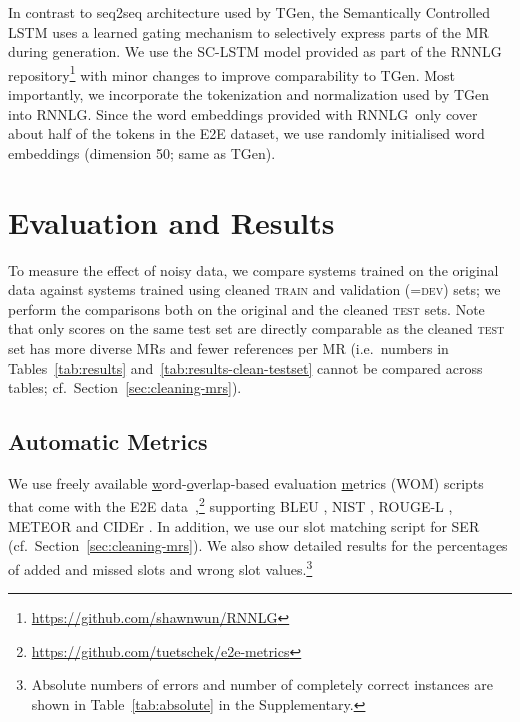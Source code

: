 \documentclass[11pt,a4paper]{article}
\newcommand{\rnnlg}{\textsc{RNNLG}}
\begin{document}
In contrast to seq2seq architecture used by TGen, the Semantically Controlled LSTM \citep[SC-LSTM,][]{wen:emnlp2015} uses a learned gating mechanism to selectively express parts of the MR during generation.
We use the SC-LSTM model provided as part of the \rnnlg{} repository\footnote{\url{https://github.com/shawnwun/RNNLG}} with minor changes to improve comparability to TGen.
Most importantly, we incorporate the tokenization and normalization used by TGen into \rnnlg.
Since the word embeddings provided with \rnnlg\ only cover about half of the tokens in the E2E dataset, we use randomly initialised word embeddings (dimension 50; same as TGen).






\section{Evaluation and Results}
\label{sec:evaluation}



To measure the effect of noisy data, we compare systems trained on the original data against systems trained using cleaned \textsc{train} and validation (=\textsc{dev}) sets; we perform the comparisons both on the original and the cleaned \textsc{test} sets.
Note that only scores on the same test set are directly comparable as the cleaned \textsc{test} set has more diverse MRs and fewer references per MR (i.e.\ numbers in Tables~\ref{tab:results} and~\ref{tab:results-clean-testset} cannot be compared across tables; cf.~Section~\ref{sec:cleaning-mrs}).



\subsection{Automatic Metrics}
\label{sec:automatic}

We use freely available \underline{w}ord-\underline{o}verlap-based evaluation \underline{m}etrics (WOM) scripts that come with the E2E data~\cite{dusek_evaluating_2019},\footnote{\url{https://github.com/tuetschek/e2e-metrics}}
 supporting BLEU \cite{papineni2002bleu}, NIST \cite{nist}, ROUGE-L \cite{lin2004rouge}, METEOR \cite{lavie_meteor:_2007} and CIDEr \cite{cider}.
In addition, we use our slot matching script for SER (cf.~Section~\ref{sec:cleaning-mrs}).
We also show detailed results for the percentages of added and missed slots and wrong slot values.\footnote{Absolute numbers of errors and number of completely correct instances are shown in Table~\ref{tab:absolute} in the Supplementary.}
\end{document}
